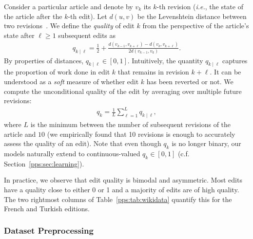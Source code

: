 Consider a particular article and denote by $v_k$ its $k$-th revision (\textit{i.e.}, the state of the article after the $k$-th edit).
Let $d(u, v)$ be the Levenshtein distance between two revisions~\citep{kruskal1983overview}.
We define the \emph{quality} of edit $k$ from the perspective of the article's state after $\ell \ge 1$ subsequent edits as
\begin{align*}
	q_{k \mid \ell} = \frac{1}{2} + \frac{d(v_{k-1}, v_{k + \ell}) - d(v_k, v_{k + \ell})}{2 d(v_{k-1}, v_k)}.
\end{align*}
By properties of distances, $q_{k \mid \ell} \in [0, 1]$.
Intuitively, the quantity $q_{k \mid \ell}$ captures the proportion of work done in edit $k$ that remains in revision $k + \ell$.
It can be understood as a \emph{soft} measure of whether edit $k$ has been reverted or not.
We compute the unconditional quality of the edit by averaging over multiple future revisions:
\begin{align}
	\label{pps:eq:wikiqual}
	q_k = \frac{1}{L} \sum_{\ell = 1}^L q_{k \mid \ell},
\end{align}
where $L$ is the minimum between the number of subsequent revisions of the article and $10$ (we empirically found that \num{10} revisions is enough to accurately assess the quality of an edit).
Note that even though $q_k$ is no longer binary, our models naturally extend to continuous-valued $q_k \in [0,1]$ (c.f. Section~\ref{pps:sec:learning}).

In practice, we observe that edit quality is bimodal and asymmetric.
Most edits have a quality close to either \num{0} or \num{1} and a majority of edits are of high quality.
The two rightmost columns of Table~\ref{pps:tab:wikidata} quantify this for the French and Turkish editions.

\subsubsection{Dataset Preprocessing}

